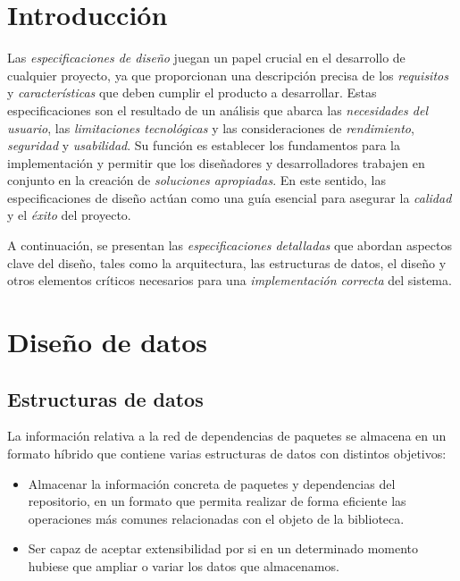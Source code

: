 
\section{Introducción}

Las \textit{especificaciones de diseño} juegan un papel crucial en el desarrollo de cualquier proyecto, 
ya que proporcionan una descripción precisa de los \textit{requisitos} y \textit{características} que 
deben cumplir el producto a desarrollar. Estas 
especificaciones son el resultado de un análisis que abarca 
las \textit{necesidades del usuario}, las \textit{limitaciones tecnológicas} y las consideraciones 
de \textit{rendimiento}, \textit{seguridad} y \textit{usabilidad}. Su función es establecer 
los fundamentos para la implementación y permitir que los diseñadores
y desarrolladores trabajen en conjunto en la creación de \textit{soluciones apropiadas}. 
En este sentido, las especificaciones de diseño actúan como una guía esencial para asegurar 
la \textit{calidad} y el \textit{éxito} del proyecto. 

A continuación, se presentan 
las \textit{especificaciones detalladas} que abordan aspectos clave del diseño, tales 
como la arquitectura, las estructuras de datos, el diseño y otros 
elementos críticos necesarios para una \textit{implementación correcta} del sistema.

\section{Diseño de datos}

\subsection{Estructuras de datos}
La información relativa a la red de dependencias de paquetes se almacena en un formato híbrido
que contiene varias estructuras de datos con distintos objetivos:

\begin{itemize}
    \item Almacenar la información concreta de paquetes y dependencias del repositorio, en un formato
          que permita realizar de forma eficiente las operaciones más comunes relacionadas con el objeto
          de la biblioteca.

    \item Ser capaz de aceptar extensibilidad por si en un determinado momento hubiese que ampliar
          o variar los datos que almacenamos.
\end{itemize}
\

